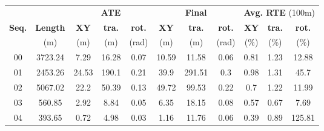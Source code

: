\begin{table}[h]
    \centering
    {\small
        \begin{tabular}{c|c|ccc|ccc|ccc}
            \hline
                          &                 & \multicolumn{3}{c|}{\textbf{ATE}} & \multicolumn{3}{c|}{\textbf{Final}} & \multicolumn{3}{c}{\textbf{Avg. RTE} (100m)}                                                                                             \\
            \textbf{Seq.} & \textbf{Length} & \textbf{XY}                       & \textbf{tra.}                       & \textbf{rot.}                                & \textbf{XY} & \textbf{tra.} & \textbf{rot.} & \textbf{XY} & \textbf{tra.} & \textbf{rot.} \\
                          & (m)             & (m)                               & (m)                                 & (rad)                                        & (m)         & (m)           & (rad)         & (\%)        & (\%)          & (\%)          \\
            \hline \hline
            00            & 3723.24         & 7.29                              & 16.28                               & 0.07                                         & 10.59       & 11.58         & 0.06          & 0.81        & 1.23          & 12.88         \\
            01            & 2453.26         & 24.53                             & 190.1                               & 0.21                                         & 39.9        & 291.51        & 0.3           & 0.98        & 1.31          & 45.7          \\
            02            & 5067.02         & 22.2                              & 50.39                               & 0.13                                         & 49.72       & 99.53         & 0.22          & 0.7         & 1.22          & 11.99         \\
            03            & 560.85          & 2.92                              & 8.84                                & 0.05                                         & 6.35        & 18.15         & 0.08          & 0.57        & 0.67          & 7.69          \\
            04            & 393.65          & 0.72                              & 4.98                                & 0.03                                         & 1.16        & 11.76         & 0.06          & 0.39        & 0.89          & 125.81        \\

\end{tabular}}
\end{table}

